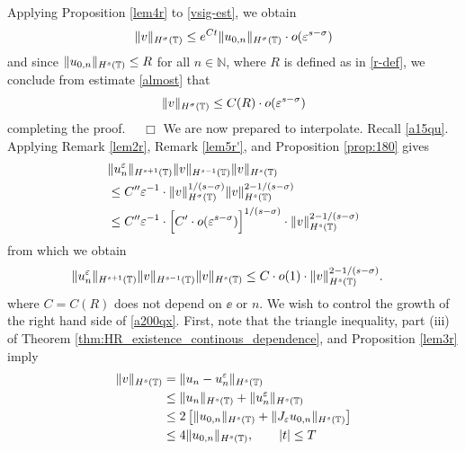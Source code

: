 Applying Proposition \ref{lem4r} to \eqref{vsig-est}, we obtain 
\begin{equation}
	\label{almost}
	\begin{split}
		\|v\|_{H^\sigma (\mathbb{T})} \le e^{Ct} \|u_{0,n}\|_{H^\sigma(\mathbb{T})} \cdot
		o(\varepsilon^{s-\sigma})
	\end{split}
\end{equation}
and since $\|u_{0,n}\|_{H^s(\mathbb{T})} \le R$ for all $n \in \mathbb{N}$, where
$R$ is defined as in \eqref{r-def}, we conclude from estimate \eqref{almost} that
\begin{equation*}
	\begin{split}
		\|v\|_{H^\sigma(\mathbb{T})} \le C(R) \cdot o(\varepsilon^{s-\sigma})
	\end{split}
\end{equation*}
completing the proof. $\quad \Box$
We are now prepared to interpolate. Recall \eqref{a15qu}. Applying Remark
\ref{lem2r}, Remark \ref{lem5r'}, and
Proposition \ref{prop:180} gives
\begin{equation*}
	\begin{split}
		& \|u^\varepsilon_n \|_{H^{s+1}(\mathbb{T})} \|v\|_{H^{s-1}(\mathbb{T})} \|v\|_{H^s
		(\mathbb{T})}
		\\
		&\le C'' \varepsilon^{-1} \cdot \|v\|_{H^\sigma(\mathbb{T})}^{1/(s-\sigma)}
		\|v\|_{H^s(\mathbb{T})}^{2 - 1/(s- \sigma)}
		\\
		& \le C'' \varepsilon^{-1} \cdot \Big [C' \cdot o(\varepsilon^{s- \sigma})\Big ]^{1/(s-\sigma)}
		\cdot \|v\|_{H^s(\mathbb{T})}^{2- 1/(s-\sigma)}
	\end{split}
\end{equation*}
from which we obtain
\begin{equation}
	\begin{split}
		\label{a200qx}
		\|u^\varepsilon_n\|_{H^{s+1}(\mathbb{T})} \|v\|_{H^{s-1}(\mathbb{T})} \|v \|_{H^s(\mathbb{T})}
		& \le  C \cdot o(1) \cdot \|v\|_{H^s(\mathbb{T})}^{2- 1/(s-\sigma)}.
	\end{split}
\end{equation}
where $C=C(R)$ does not depend on $\ee$ or $n$. We wish to control the growth of the right hand side of \eqref{a200qx}.
First, note that the triangle inequality, part (iii) of Theorem
\ref{thm:HR_existence_continous_dependence}, and Proposition \ref{lem3r} imply
\begin{equation}
	\begin{split}
		\|v\|_{H^s(\mathbb{T})} & = \|u_n - u^\varepsilon_n \|_{H^s(\mathbb{T})} 
		\\
		& \le \|u_n \|_{H^s(\mathbb{T})} + \|u^\varepsilon_n\|_{H^s(\mathbb{T})}
		\\
		& \le 2\left[ \|u_{0,n} \|_{H^s(\mathbb{T})} + \|J_\varepsilon u_{0,n}
		\|_{H^s(\mathbb{T})} \right]
		\\
		& \le 4 \|u_{0,n} \|_{H^s(\mathbb{T})}, \qquad |t| \le T
		\label{agrowth_v}
	\end{split}
\end{equation}
